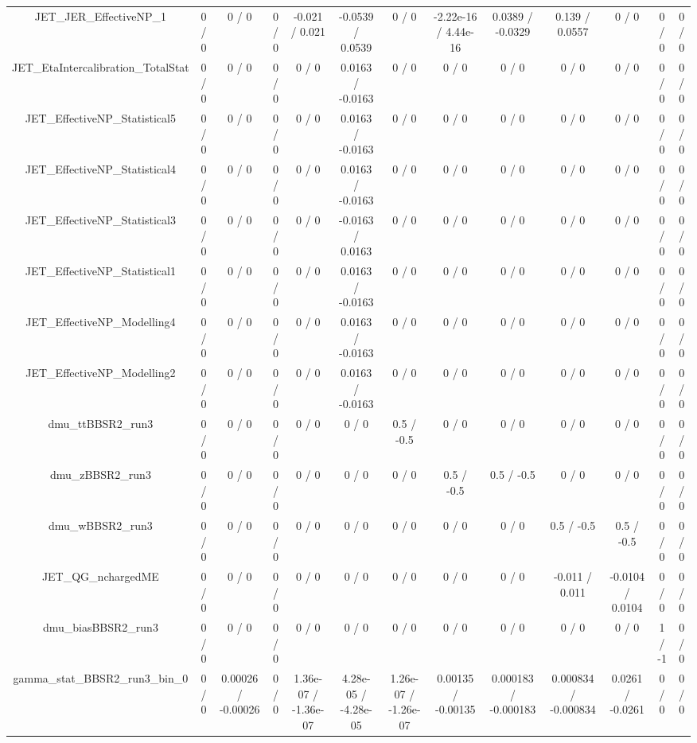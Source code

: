\documentclass[10pt]{article}
\begin{document}
\begin{table}[htbp]
\begin{center}
\begin{tabular}{|c|c|c|c|c|c|c|c|c|c|c|c|c|}
  JET_JER_EffectiveNP_1 & 0 / 0 & 0 / 0 & 0 / 0 & -0.021 / 0.021 & -0.0539 / 0.0539 & 0 / 0 & -2.22e-16 / 4.44e-16 & 0.0389 / -0.0329 & 0.139 / 0.0557 & 0 / 0 & 0 / 0 & 0 / 0 \\ 
  JET_EtaIntercalibration_TotalStat & 0 / 0 & 0 / 0 & 0 / 0 & 0 / 0 & 0.0163 / -0.0163 & 0 / 0 & 0 / 0 & 0 / 0 & 0 / 0 & 0 / 0 & 0 / 0 & 0 / 0 \\ 
  JET_EffectiveNP_Statistical5 & 0 / 0 & 0 / 0 & 0 / 0 & 0 / 0 & 0.0163 / -0.0163 & 0 / 0 & 0 / 0 & 0 / 0 & 0 / 0 & 0 / 0 & 0 / 0 & 0 / 0 \\ 
  JET_EffectiveNP_Statistical4 & 0 / 0 & 0 / 0 & 0 / 0 & 0 / 0 & 0.0163 / -0.0163 & 0 / 0 & 0 / 0 & 0 / 0 & 0 / 0 & 0 / 0 & 0 / 0 & 0 / 0 \\ 
  JET_EffectiveNP_Statistical3 & 0 / 0 & 0 / 0 & 0 / 0 & 0 / 0 & -0.0163 / 0.0163 & 0 / 0 & 0 / 0 & 0 / 0 & 0 / 0 & 0 / 0 & 0 / 0 & 0 / 0 \\ 
  JET_EffectiveNP_Statistical1 & 0 / 0 & 0 / 0 & 0 / 0 & 0 / 0 & 0.0163 / -0.0163 & 0 / 0 & 0 / 0 & 0 / 0 & 0 / 0 & 0 / 0 & 0 / 0 & 0 / 0 \\ 
  JET_EffectiveNP_Modelling4 & 0 / 0 & 0 / 0 & 0 / 0 & 0 / 0 & 0.0163 / -0.0163 & 0 / 0 & 0 / 0 & 0 / 0 & 0 / 0 & 0 / 0 & 0 / 0 & 0 / 0 \\ 
  JET_EffectiveNP_Modelling2 & 0 / 0 & 0 / 0 & 0 / 0 & 0 / 0 & 0.0163 / -0.0163 & 0 / 0 & 0 / 0 & 0 / 0 & 0 / 0 & 0 / 0 & 0 / 0 & 0 / 0 \\ 
  dmu_ttBBSR2_run3 & 0 / 0 & 0 / 0 & 0 / 0 & 0 / 0 & 0 / 0 & 0.5 / -0.5 & 0 / 0 & 0 / 0 & 0 / 0 & 0 / 0 & 0 / 0 & 0 / 0 \\ 
  dmu_zBBSR2_run3 & 0 / 0 & 0 / 0 & 0 / 0 & 0 / 0 & 0 / 0 & 0 / 0 & 0.5 / -0.5 & 0.5 / -0.5 & 0 / 0 & 0 / 0 & 0 / 0 & 0 / 0 \\ 
  dmu_wBBSR2_run3 & 0 / 0 & 0 / 0 & 0 / 0 & 0 / 0 & 0 / 0 & 0 / 0 & 0 / 0 & 0 / 0 & 0.5 / -0.5 & 0.5 / -0.5 & 0 / 0 & 0 / 0 \\ 
  JET_QG_nchargedME & 0 / 0 & 0 / 0 & 0 / 0 & 0 / 0 & 0 / 0 & 0 / 0 & 0 / 0 & 0 / 0 & -0.011 / 0.011 & -0.0104 / 0.0104 & 0 / 0 & 0 / 0 \\ 
  dmu_biasBBSR2_run3 & 0 / 0 & 0 / 0 & 0 / 0 & 0 / 0 & 0 / 0 & 0 / 0 & 0 / 0 & 0 / 0 & 0 / 0 & 0 / 0 & 1 / -1 & 0 / 0 \\ 
  gamma_stat_BBSR2_run3_bin_0 & 0 / 0 & 0.00026 / -0.00026 & 0 / 0 & 1.36e-07 / -1.36e-07 & 4.28e-05 / -4.28e-05 & 1.26e-07 / -1.26e-07 & 0.00135 / -0.00135 & 0.000183 / -0.000183 & 0.000834 / -0.000834 & 0.0261 / -0.0261 & 0 / 0 & 0 / 0 \\ 

\end{tabular}
\end{center}
\end{table}
\end{document}
